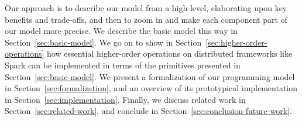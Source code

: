 \documentclass[preprint]{sigplanconf}
\theoremstyle{definition}
\theoremstyle{definition}
\begin{document}

Our approach is to describe our model from a high-level, elaborating upon key
benefits and trade-offs, and then to zoom in and make each component part of
our model more precise. We describe the basic model this way in
Section~\ref{sec:basic-model}. We go on to show in Section~\ref{sec:higher-order-operations}
how essential higher-order operations on distributed
frameworks like Spark can be implemented in terms of the primitives presented
in Section~\ref{sec:basic-model}. We present a formalization of our
programming model in Section~\ref{sec:formalization}, and an overview of its
prototypical implementation in Section~\ref{sec:implementation}.
Finally, we discuss related work in Section~\ref{sec:related-work}, and
conclude in Section~\ref{sec:conclusion-future-work}.





\end{document}
